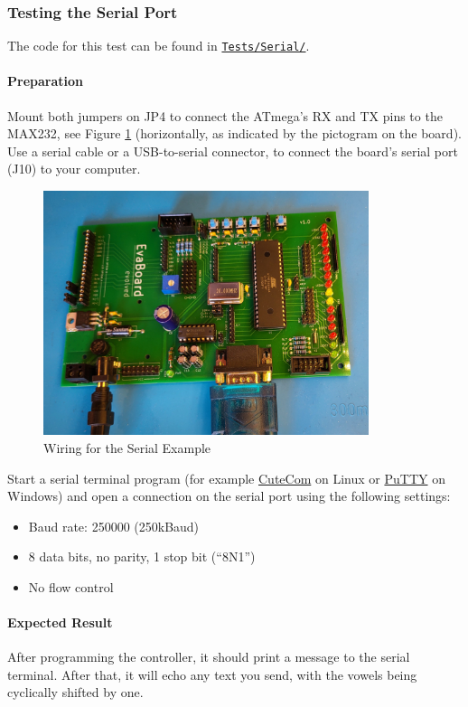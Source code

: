 \documentclass{article}
\newcommand{\file}[1]{\texttt{#1}}
\begin{document}
\subsubsection{Testing the Serial Port}\label{sec:testSerial}
The code for this test can be found in \href{../Tests/Serial/}{\file{Tests/Serial/}}. 

\paragraph{Preparation}
Mount both jumpers on JP4 to connect the ATmega's RX and TX pins to the MAX232, see Figure \ref{fig:wiringSerial} (horizontally, as indicated by the pictogram on the board). Use a serial cable or a USB-to-serial connector, to connect the board's serial port (J10) to your computer. 

\begin{figure}[htb]
\centering
\includegraphics[width=0.85\textwidth]{Pictures/WiringSerial.jpg}
\caption{Wiring for the Serial Example}
\label{fig:wiringSerial}
\end{figure}

Start a serial terminal program (for example \href{https://cutecom.sourceforge.net/}{CuteCom} on Linux or \href{https://www.putty.org/}{PuTTY} on Windows) and open a connection on the serial port using the following settings:
\begin{itemize}
\item Baud rate: 250000 (250kBaud)
\item 8 data bits, no parity, 1 stop bit (``8N1'')
\item No flow control
\end{itemize}

\paragraph{Expected Result}
After programming the controller, it should print a message to the serial terminal. After that, it will echo any text you send, with the vowels being cyclically shifted by one. 
\end{document}
